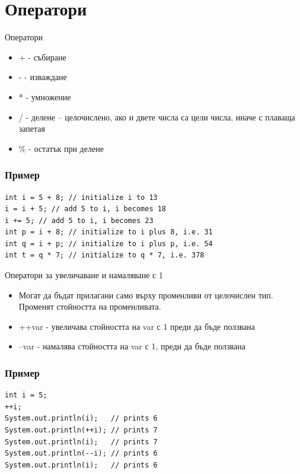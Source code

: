 \documentclass{beamer}
\begin{document}
\section{Оператори}
\begin{frame}{Оператори}
  \transdissolve
  \begin{itemize}
  \item + - събиране
  \item - - изваждане
  \item * - умножение
  \item / - делене – целочислено, ако и двете
    числа са цели числа, иначе с плаваща
    запетая
  \item \% - остатък при делене
  \end{itemize}
\end{frame}

\begin{frame}[fragile]
  \frametitle{Пример}
  \transdissolve
\begin{lstlisting}
int i = 5 + 8; // initialize i to 13
i = i + 5; // add 5 to i, i becomes 18
i += 5; // add 5 to i, i becomes 23
int p = i + 8; // initialize to i plus 8, i.e. 31
int q = i + p; // initialize to i plus p, i.e. 54
int t = q * 7; // initialize to q * 7, i.e. 378
\end{lstlisting}
\end{frame}

\begin{frame}{Оператори за увеличаване и намаляване с 1}
  \transdissolve
  \begin{itemize}
  \item Могат да бъдат прилагани само върху
    променливи от целочислен тип.
    Променят стойността на променливата.

   \item ++var - увеличава стойността на var с 1
    преди да бъде ползвана

   \item --var - намалява стойността на var с 1,
    преди да бъде ползвана
  \end{itemize}
\end{frame}

\begin{frame}[fragile]
  \frametitle{Пример}
  \transdissolve
\begin{lstlisting}
int i = 5;
++i;
System.out.println(i);   // prints 6
System.out.println(++i); // prints 7
System.out.println(i);   // prints 7
System.out.println(--i); // prints 6
System.out.println(i);   // prints 6
\end{lstlisting}
\end{frame}
\end{document}
